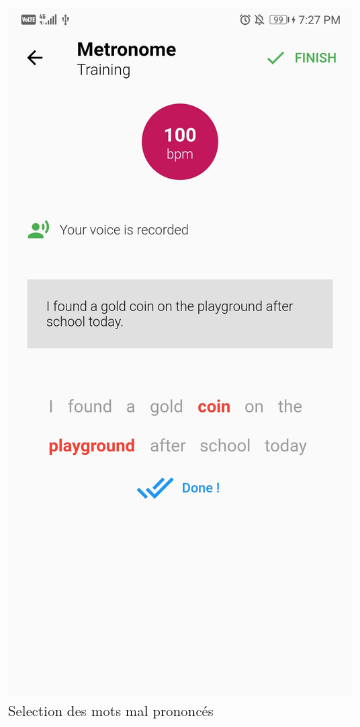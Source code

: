\begin{appendices}
\begin{landscape}
\begin{figure}[h]
  \begin{subfigure}{.25\textwidth}
    \centering
    \includegraphics[width=.75\linewidth]{content/imgs/screen5.jpg}
    \caption{Selection des mots mal prononcés}
    \label{appendix:screen_exercice_words_check}
  \end{subfigure}%
  \begin{subfigure}{.25\textwidth}
    \centering

\end{subfigure}
\end{figure}
\end{landscape}
\end{appendices}
